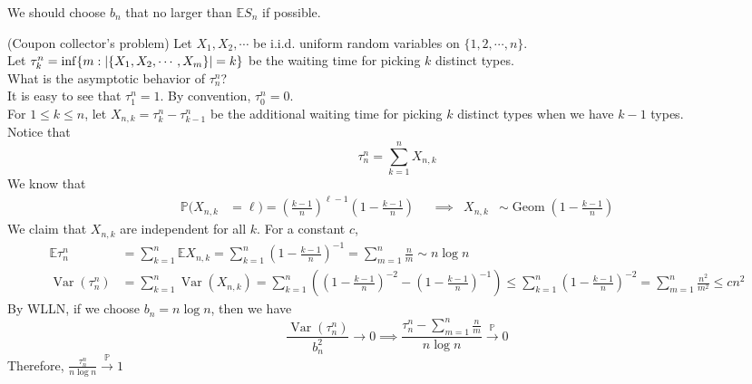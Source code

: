 \documentclass{huhtakm-template-book}
\newcommand{\prob}{\mathbb{P}}
\newcommand{\expect}{\mathbb{E}}
\DeclareMathOperator{\Geom}{Geom}
\DeclareMathOperator{\Var}{Var}
\begin{document}
\begin{rem}
    We should choose $b_{n}$ that no larger than $\expect S_{n}$ if possible.
\end{rem}
\begin{eg}(Coupon collector's problem) 
    Let $X_{1},X_{2},\cdots$ be i.i.d. uniform random variables on $\{1,2,\cdots,n\}$.\\
    Let $\tau_{k}^{n}=\inf\{m:\left|{\{X_{1},X_{2},\cdots,X_{m}\}}\right|=k\}$ be the waiting time for picking $k$ distinct types.\\
    What is the asymptotic behavior of $\tau_{n}^{n}$?\\
    It is easy to see that $\tau_{1}^{n}=1$. By convention, $\tau_{0}^{n}=0$.\\
    For $1\leq k\leq n$, let $X_{n,k}=\tau_{k}^{n}-\tau_{k-1}^{n}$ be the additional waiting time for picking $k$ distinct types when we have $k-1$ types.\\
    Notice that
    \begin{equation*}
        \tau_{n}^{n}=\sum_{k=1}^{n}X_{n,k}
    \end{equation*}
    We know that
    \begin{align*}
        \prob(X_{n,k}&=\ell)=\left(\frac{k-1}{n}\right)^{\ell-1}\left(1-\frac{k-1}{n}\right) & &\implies & X_{n,k}&\sim\Geom\left(1-\frac{k-1}{n}\right)
    \end{align*}
    We claim that $X_{n,k}$ are independent for all $k$. For a constant $c$,
    \begin{align*}
        \expect\tau_{n}^{n}&=\sum_{k=1}^{n}\expect X_{n,k}=\sum_{k=1}^{n}\left(1-\frac{k-1}{n}\right)^{-1}=\sum_{m=1}^{n}\frac{n}{m}\sim n\log n\\
        \Var(\tau_{n}^{n})&=\sum_{k=1}^{n}\Var(X_{n,k})=\sum_{k=1}^{n}\left(\left(1-\frac{k-1}{n}\right)^{-2}-\left(1-\frac{k-1}{n}\right)^{-1}\right)\leq\sum_{k=1}^{n}\left(1-\frac{k-1}{n}\right)^{-2}=\sum_{m=1}^{n}\frac{n^{2}}{m^{2}}\leq cn^{2}
    \end{align*}
    By WLLN, if we choose $b_{n}=n\log n$, then we have
    \begin{equation*}
        \frac{\Var(\tau_{n}^{n})}{b_{n}^{2}}\to 0\implies\frac{\tau_{n}^{n}-\sum_{m=1}^{n}\frac{n}{m}}{n\log n}\xrightarrow{\prob}0
    \end{equation*}
    Therefore, $\frac{\tau_{n}^{n}}{n\log n}\xrightarrow{\prob}1$
\end{eg}
\end{document}
